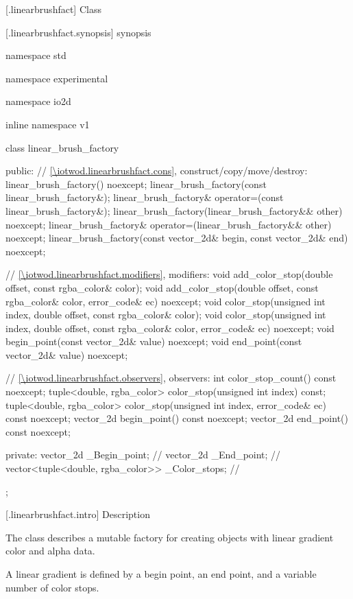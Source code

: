  [\iotwod.linearbrushfact] {Class }

 [\iotwod.linearbrushfact.synopsis] { synopsis}

\begin{codeblock}
namespace std { namespace experimental { namespace io2d { inline namespace v1 {
  class linear_brush_factory {
  public:
    // \ref{\iotwod.linearbrushfact.cons}, construct/copy/move/destroy:
    linear_brush_factory() noexcept;
    linear_brush_factory(const linear_brush_factory&);
    linear_brush_factory& operator=(const linear_brush_factory&);
    linear_brush_factory(linear_brush_factory&& other) noexcept;
    linear_brush_factory& operator=(linear_brush_factory&& other) noexcept;
    linear_brush_factory(const vector_2d& begin, const vector_2d& end) noexcept;

    // \ref{\iotwod.linearbrushfact.modifiers}, modifiers:
    void add_color_stop(double offset, const rgba_color& color);
    void add_color_stop(double offset, const rgba_color& color, 
      error_code& ec) noexcept;
    void color_stop(unsigned int index, double offset,
      const rgba_color& color);
    void color_stop(unsigned int index, double offset,
      const rgba_color& color, error_code& ec) noexcept;
    void begin_point(const vector_2d& value) noexcept;
    void end_point(const vector_2d& value) noexcept;

    // \ref{\iotwod.linearbrushfact.observers}, observers:
    int color_stop_count() const noexcept;
    tuple<double, rgba_color> color_stop(unsigned int index) const;
    tuple<double, rgba_color> color_stop(unsigned int index,
      error_code& ec) const noexcept;
    vector_2d begin_point() const noexcept;
    vector_2d end_point() const noexcept;

  private:
    vector_2d _Begin_point;                             // \expos
    vector_2d _End_point;                               // \expos
    vector<tuple<double, rgba_color>> _Color_stops; // \expos
  };
} } } }
\end{codeblock}

 [\iotwod.linearbrushfact.intro] { Description}

\pnum
{}
The class  describes a mutable factory for creating  objects with linear gradient color and alpha data.

\pnum
A linear gradient is defined by a begin point, an end point, and a variable number of color stops.

